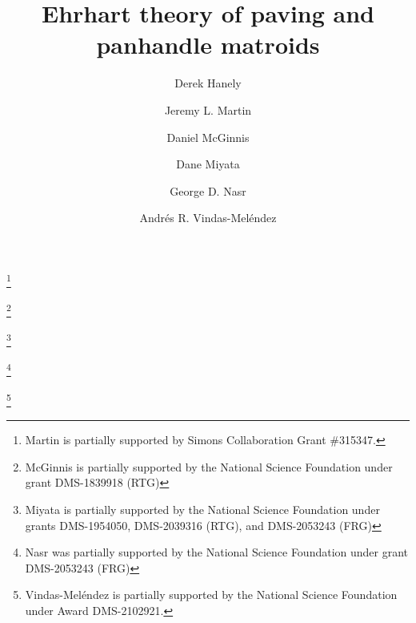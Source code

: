\documentclass[11pt]{amsart}
\theoremstyle{definition}
\newcommand{\0}{\emptyset}
\begin{document}
\title{Ehrhart theory of paving and panhandle matroids}

\author{Derek Hanely}
\address{Department of Mathematics\\
         Penn State Behrend\\
\url{https://behrend.psu.edu/person/derek-hanely}}

\author{Jeremy L. Martin}
\thanks{Martin is partially supported by Simons Collaboration Grant \#315347.}
\address{Department of Mathematics\\
         University of Kansas\\
\url{https://jlmartin.ku.edu/}}

\author{Daniel McGinnis}
\thanks{McGinnis is partially supported by the National Science Foundation under grant DMS-1839918 (RTG)}
\address{Department of Mathematics\\
        Iowa State University\\
\url{https://sites.google.com/iastate.edu/danielmcginnis/home}}

\author{Dane Miyata}
\thanks{Miyata is partially supported by the National Science Foundation under grants DMS-1954050, DMS-2039316 (RTG), and DMS-2053243 (FRG)}
\address{Department of Mathematics\\
         University of Oregon\\
\url{https://math.uoregon.edu/profile/dmiyata}}

\author{George D. Nasr}
\thanks{Nasr was partially supported by the National Science Foundation under  grant DMS-2053243 (FRG)}
\address{Department of Mathematics\\
         Augustana University\\
\url{https://sites.google.com/view/george-d-nasr-math}}

\author{Andr\'es R. Vindas-Mel\'endez}
\thanks{Vindas-Mel\'endez is partially supported by the National Science Foundation under Award DMS-2102921.}
\address{Department of Mathematics\\
         University of California, Berkeley\\
\url{https://math.berkeley.edu/~vindas}}
\end{document}
